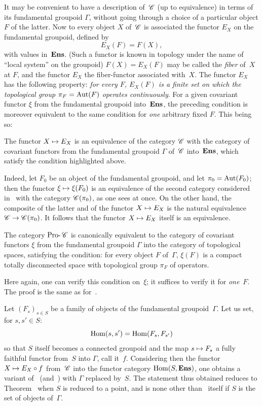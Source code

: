 It may be convenient to have a description of~$\cal{C}$ (up to
equivalence) in terms of its fundamental groupoid
$\Gamma$, without going through a choice of a particular object $F$ of the
latter. Now to every object $X$ of~$\cal{C}$ is associated the
functor $E_X$ on the fundamental groupoid, defined by
$$
E_X(F)=F(X),
$$
with values in~$\mathbf{Ens}$. (Such a functor is known in topology
under the name of ``local system'' on the groupoid)
$F(X)=E_X(F)$ may be called the \emph{fiber} of~$X$ at $F$,
and the functor $E_X$ the fiber-functor associated with~$X$. The
functor $E_X$ has the following
property:
\emph{for every $F$, $E_X(F)$ is a finite set
on which the topological group $\pi_F=\operatorname{Aut}(F)$ operates continuously}.
For a
given covariant functor $\xi$ from the fundamental groupoid
into~$\mathbf{Ens}$, the preceding condition is moreover equivalent
to the same condition for \emph{one} arbitrary fixed $F$.
This being so:

\begin{proposition}
\label{V.5.8}
The functor $X\mto E_X$ is an equivalence of the category
$\cal{C}$ with the category of covariant functors from the
fundamental groupoid $\Gamma$ of~$\cal{C}$ into~$\mathbf{Ens}$, which
satisfy the condition
highlighted above.
\end{proposition}

Indeed, let $F_0$ be an object of the fundamental groupoid, and let
$\pi_0=\operatorname{Aut}(F_0)$; then the functor $\xi\mto \xi(F_0)$ is an
equivalence of the second category considered
in~ with the category $\cal{C}(\pi_0)$, as one
sees at once. On the other hand, the composite of the latter and
of the functor $X\mto E_X$ is the natural equivalence
$\cal{C}\to\cal{C}(\pi_0)$. It follows that the functor
$X\mto E_X$ itself is an equivalence.

\begin{corollary}
\label{V.5.9}
The category $\Prodash\cal{C}$
is canonically equivalent to the category of covariant
functors $\xi$ from the fundamental groupoid $\Gamma$ into the
category of topological spaces, satisfying the condition:
for every object $F$ of~$\Gamma$, $\xi(F)$ is a compact totally
disconnected space with topological group $\pi_F$
of operators.
\end{corollary}

Here again, one can verify this condition on~$\xi$; it suffices
to verify it for \emph{one}~$F$. The proof is the
same as for~.

\begin{remark}
\label{V.5.10}
Let $(F_s)_{s\in S}$ be a family
of objects
of the fundamental groupoid~$\Gamma$. Let us set, for $s, s'\in S$:
$$
\operatorname{Hom}(s, s')=\operatorname{Hom}(F_s, F_{s'})
$$
so that $S$ itself becomes a connected groupoid and
the map $s\mto F_s$ a fully faithful functor from~$S$
into $\Gamma$, call it~$f$. Considering then the functor $X\mto
E_X\circ f$ from~$\cal{C}$ into the functor category
$\operatorname{Hom}(S,\mathbf{Ens})$, one obtains a variant of~
(and~) with $\Gamma$ replaced by~$S$. The statement
thus obtained reduces to Theorem~ when $S$
is reduced to a point, and is none other than~
itself if $S$ is the set of objects of~$\Gamma$.
\end{remark}

